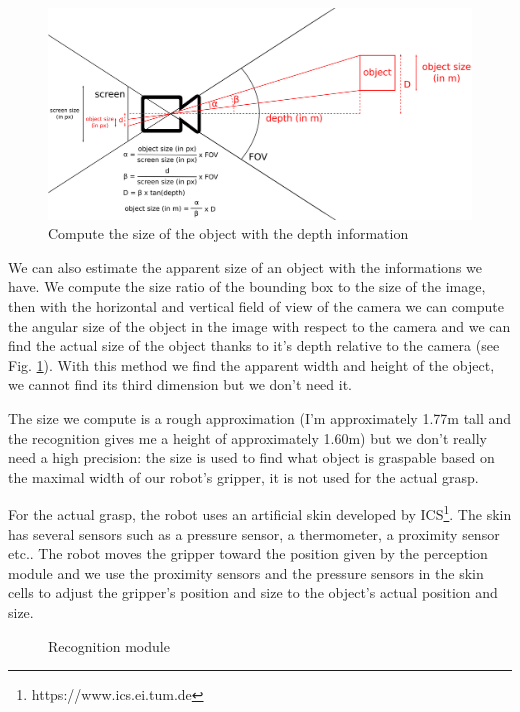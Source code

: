 \documentclass[a4paper, twocolumn]{article}
\begin{document}
    \begin{figure}[!b]
        \includegraphics[width=\textwidth]{../img/camera_size.jpg}
        \caption{Compute the size of the object with the depth information}
        \label{camera_size}
    \end{figure}

    We can also estimate the apparent size of an object with the informations we have. We compute the size ratio of the bounding box to the size of the image, then with the horizontal and vertical field of view of the camera we can compute the angular size of the object in the image with respect to the camera and we can find the actual size of the object thanks to it's depth relative to the camera (see Fig. \ref{camera_size}). With this method we find the apparent width and height of the object, we cannot find its third dimension but we don't need it.

    The size we compute is a rough approximation (I'm approximately 1.77m tall and the recognition gives me a height of approximately 1.60m) but we don't really need a high precision: the size is used to find what object is graspable based on the maximal width of our robot's gripper, it is not used for the actual grasp. 
    
    For the actual grasp, the robot uses an artificial skin \cite{hum} developed by ICS\footnote{https://www.ics.ei.tum.de}. The skin has several sensors such as a pressure sensor, a thermometer, a proximity sensor etc.. The robot moves the gripper toward the position given by the perception module and we use the proximity sensors and the pressure sensors in the skin cells to adjust the gripper's position and size to the object's actual position and size.
    
    \begin{figure}
        \resizebox{.9\textwidth}{!}{}
        \caption{Recognition module}
        \label{recognition_module}
    \end{figure}
\end{document}
